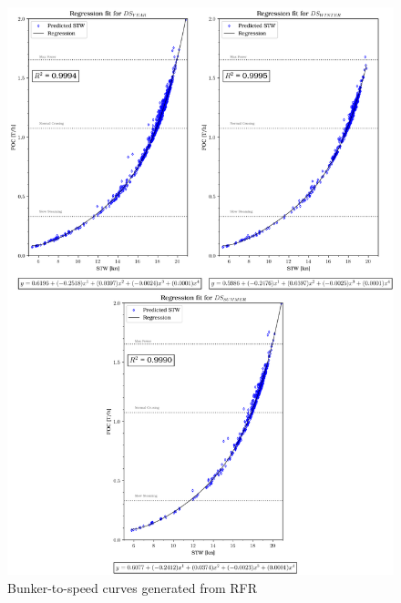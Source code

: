 \begin{figure}[h!]
    \centering
    \includegraphics[width=.9\linewidth]{02_figures/poly_rfr_combi.png}
    \caption{Bunker-to-speed curves generated from RFR}
    \label{fig:FOC_plot_rfr_combi}
\end{figure}

\newpage

